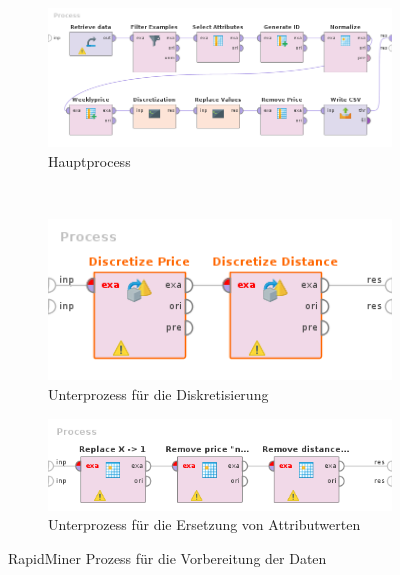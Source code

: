 \begin{figure}[H]
	\begin{subfigure}[t]{1\textwidth}
		\centering
		\includegraphics[width=1\textwidth]{images/rapidminer-process}
		\caption{Hauptprocess}
		\label{fig:recherche:rapidminer:1:1}
	\end{subfigure} \\
	\begin{subfigure}[t]{0.5\textwidth}
		\centering
		\includegraphics[width=1\textwidth]{images/rapidminer-process-discretization}
		\caption{Unterprozess für die Diskretisierung}
		\label{fig:recherche:rapidminer:1:2}
	\end{subfigure}
	\begin{subfigure}[t]{0.8\textwidth}
		\centering
		\includegraphics[width=1\textwidth]{images/rapidminer-process-replace-values}
		\caption{Unterprozess für die Ersetzung von Attributwerten}
		\label{fig:recherche:rapidminer:1:3}
	\end{subfigure}
	\caption{RapidMiner Prozess für die Vorbereitung der Daten}
	\label{fig:recherche:rapidminer:1}
\end{figure}

